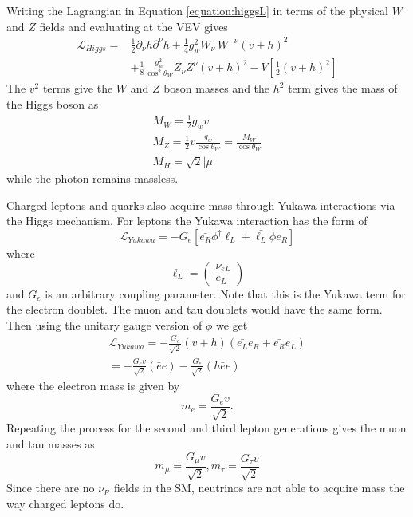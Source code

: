 Writing the Lagrangian in Equation \ref{equation:higgsL} in terms of the physical $W$ and $Z$ fields and evaluating at the VEV gives 
\begin{equation}
	\begin{split}
	\mathcal{L}_{Higgs} = &\frac{1}{2}\partial_\nu h\partial^\nu h + \frac{1}{4}g_w^2W_\nu^+W^{-\nu}(v+h)^2 \\
	& + \frac{1}{8}\frac{g_w^2}{\cos^2\theta_W}Z_\nu Z^\nu (v+h)^2 - V[\frac{1}{2}(v+h)^2]
	\end{split}
\end{equation}
The $v^2$ terms give the $W$ and $Z$ boson masses and the $h^2$ term gives the mass of the Higgs boson as
\begin{eqnarray}
	M_W = \frac{1}{2}g_wv \\
	M_Z = \frac{1}{2}v\frac{g_w}{\cos\theta_W} = \frac{M_W}{\cos\theta_W} \\
	M_H = \sqrt{2}|\mu|
\end{eqnarray}
while the photon remains massless.

Charged leptons and quarks also acquire mass through Yukawa interactions via the Higgs mechanism.  For leptons the Yukawa interaction has the form of 
\begin{equation}
	\mathcal{L}_{Yukawa} = -G_e[\bar{e_R}\phi^\dagger\ell_L + \bar{\ell_L}\phi e_R]
\end{equation}
where 
\begin{equation}
	\ell_L = 
	\left(
	\begin{array}{c}
		\nu_{eL} \\
		e_L
	\end{array}
	\right)
\end{equation}
and $G_e$ is an arbitrary coupling parameter.  Note that this is the Yukawa term for the electron doublet.  The muon and tau doublets would have the same form.  Then using the unitary gauge version of $\phi$ we get 
\begin{eqnarray}
	\mathcal{L}_{Yukawa} = -\frac{G_e}{\sqrt{2}}(v + h)(\bar{e_L}e_R + \bar{e_R}e_L) \\
	= -\frac{G_ev}{\sqrt{2}}(\bar{e}e) -\frac{G_e}{\sqrt{2}}(h\bar{e}e)
\end{eqnarray}
where the electron mass is given by 
\begin{equation}
	m_e = \frac{G_ev}{\sqrt{2}}.
\end{equation}
Repeating the process for the second and third lepton generations gives the muon and tau masses as
\begin{equation}
	m_\mu = \frac{G_\mu v}{\sqrt{2}}, m_\tau = \frac{G_\tau v}{\sqrt{2}}
\end{equation}
Since there are no $\nu_R$ fields in the SM, neutrinos are not able to acquire mass the way charged leptons do.  

